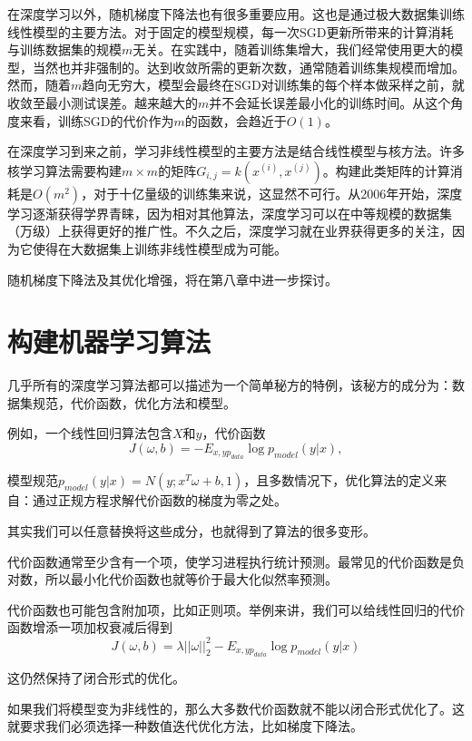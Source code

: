 在深度学习以外，随机梯度下降法也有很多重要应用。这也是通过极大数据集训练线性模型的主要方法。对于固定的模型规模，每一次SGD更新所带来的计算消耗与训练数据集的规模$m$无关。在实践中，随着训练集增大，我们经常使用更大的模型，当然也并非强制的。达到收敛所需的更新次数，通常随着训练集规模而增加。然而，随着$m$趋向无穷大，模型会最终在SGD对训练集的每个样本做采样之前，就收敛至最小测试误差。越来越大的$m$并不会延长误差最小化的训练时间。从这个角度来看，训练SGD的代价作为$m$的函数，会趋近于$O(1)$。

在深度学习到来之前，学习非线性模型的主要方法是结合线性模型与核方法。许多核学习算法需要构建$m \times m$的矩阵$G_{i,j}=k(x^{(i)}, x^{(j)})$。构建此类矩阵的计算消耗是$O(m^2)$，对于十亿量级的训练集来说，这显然不可行。从2006年开始，深度学习逐渐获得学界青睐，因为相对其他算法，深度学习可以在中等规模的数据集（万级）上获得更好的推广性。不久之后，深度学习就在业界获得更多的关注，因为它使得在大数据集上训练非线性模型成为可能。

随机梯度下降法及其优化增强，将在第八章中进一步探讨。

\section{构建机器学习算法}
\label{sec:5.10}

几乎所有的深度学习算法都可以描述为一个简单秘方的特例，该秘方的成分为：数据集规范，代价函数，优化方法和模型。

例如，一个线性回归算法包含$X$和$y$，代价函数
\begin{equation}
	 J(\omega , b) = -E_{x,y p_{data}} \log p_{model}(y|x),
    \label{form:5.92}
\end{equation}

模型规范$p_{model}(y|x)=N(y;x^T\omega+b,1)$，且多数情况下，优化算法的定义来自：通过正规方程求解代价函数的梯度为零之处。

其实我们可以任意替换将这些成分，也就得到了算法的很多变形。

代价函数通常至少含有一个项，使学习进程执行统计预测。最常见的代价函数是负对数，所以最小化代价函数也就等价于最大化似然率预测。

代价函数也可能包含附加项，比如正则项。举例来讲，我们可以给线性回归的代价函数增添一项加权衰减后得到
\begin{equation}
	J(\omega  ,b) = \lambda ||\omega||_2^2 - E_{x,y p_{data}} \log p_{model}(y|x)
	\label{form:5.93}
\end{equation}

这仍然保持了闭合形式的优化。

如果我们将模型变为非线性的，那么大多数代价函数就不能以闭合形式优化了。这就要求我们必须选择一种数值迭代优化方法，比如梯度下降法。

